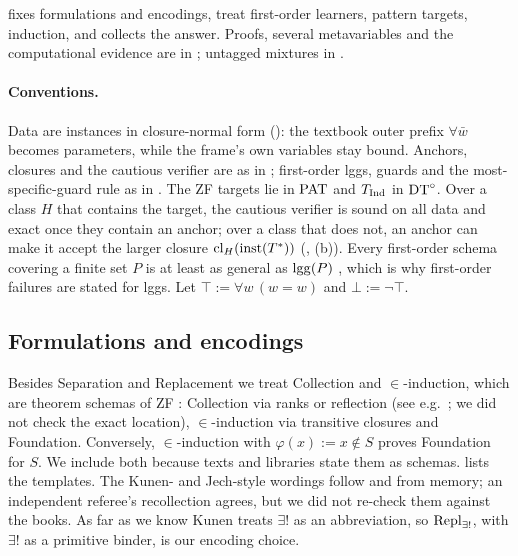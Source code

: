  fixes formulations and encodings,  treat first-order learners,
 pattern targets,  induction, and  collects the answer.
Proofs, several metavariables and the computational evidence are in ; untagged mixtures in .

\paragraph{Conventions.} Data are instances in closure-normal form (): the textbook outer
prefix $\forall\bar w$ becomes parameters, while the frame's own variables stay bound. Anchors, closures and the
cautious verifier are as in ; first-order lggs, guards and the most-specific-guard rule as
in . The ZF targets lie in $\mathrm{PAT}$ and $T_{\mathrm{Ind}}$ in $\mathrm{DT}^{\circ}$. Over a class $H$ that contains the
target, the cautious verifier is sound on all data and exact once they contain an anchor; over a class that does not,
an anchor can make it accept the larger closure $\mathrm{cl}_H(\mathrm{inst}(T^*))$ (,
(b)). Every first-order schema covering a finite set $P$ is at least
as general as $\mathrm{lgg}(P)$ \citep{plotkin1970note,reynolds1970transformational}, which is why first-order failures are
stated for lggs. Let $\top:=\forall w\,(w=w)$ and $\bot:=\neg\top$.

\subsection{Formulations and encodings}\label{sec:zf:forms}

Besides Separation and Replacement we treat Collection and $\in$-induction, which are theorem schemas of ZF
: Collection via ranks or reflection (see e.g.\ \citealp{levy1979basic}; we did not check the exact
location), $\in$-induction via transitive closures and Foundation. Conversely, $\in$-induction with $\varphi(x):=x\notin
S$ proves Foundation for $S$. We include both because texts and libraries state them as schemas.
 lists the templates. The Kunen- and Jech-style wordings follow \citet[ch.~I]{kunen1980set} and
\citet[ch.~1]{jech2003set} from memory; an independent referee's recollection agrees, but we did not re-check them
against the books. As far as we know Kunen treats $\exists!$ as an abbreviation, so $\mathrm{Repl}_{\exists!}$, with $\exists!$ as a
primitive binder, is our encoding choice.

